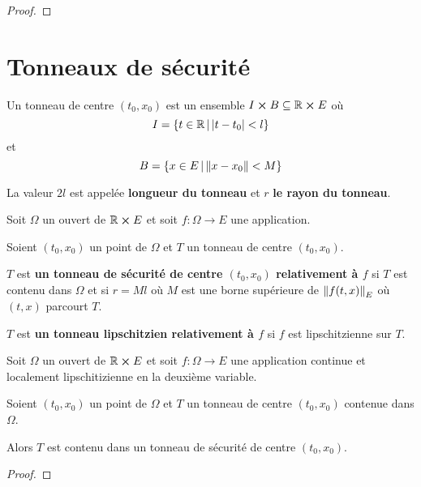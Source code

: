 \documentclass[a4paper, 11pt]{report}
\begin{document}
	\ifdefined\outputproof
	\begin{proof}

	\end{proof}
	\fi

\section{Tonneaux de sécurité}

\begin{definition}
	Un tonneau de centre $(t_{0}, x_{0})$ est un ensemble $I \cross B
	\subseteq \mathbb{R} \cross E$ où
	\begin{equation}
		I = \left\{t \in \mathbb{R} \, | \, \abs{t - t_{0}} < l \right\}
	\end{equation}
	et
	\begin{equation}
		B = \left\{x \in E \, | \, \norm{x - x_{0}} < M \right\}
	\end{equation}

	La valeur $2l$ est appelée \textbf{longueur du tonneau} et $r$ \textbf{le
	rayon du tonneau}.
\end{definition}

\begin{definition}
	Soit $\Omega$ un ouvert de $\mathbb{R} \cross E$ et soit $f : \Omega
	\rightarrow E$ une application.

	Soient $(t_{0}, x_{0})$ un point de $\Omega$ et $T$ un tonneau de
	centre $(t_{0}, x_{0})$.

	$T$ est \textbf{un tonneau de sécurité de centre $(t_{0}, x_{0})$
relativement à $f$} si $T$ est contenu dans $\Omega$ et si $r = Ml$ où $M$ est
une borne supérieure de $\norm{f(t, x)}_{E}$ où $(t, x)$ parcourt $T$.

	$T$ est \textbf{un tonneau lipschitzien relativement à $f$} si $f$ est
	lipschitzienne sur $T$.
\end{definition}

\begin{proposition}
	Soit $\Omega$ un ouvert de $\mathbb{R} \cross E$ et soit $f : \Omega
	\rightarrow E$ une application continue et localement lipschitizienne en la
	deuxième variable.

	Soient $(t_{0}, x_{0})$ un point de $\Omega$ et $T$ un tonneau de
	centre $(t_{0}, x_{0})$ contenue dans $\Omega$.

	Alors $T$ est contenu dans un tonneau de sécurité de centre $(t_{0},
	x_{0})$.
\end{proposition}

\ifdefined\outputproof
\begin{proof}

\end{proof}
\fi
\end{document}
